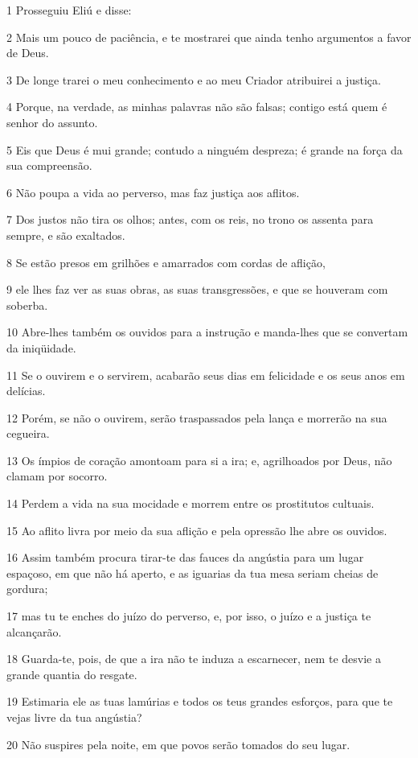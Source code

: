 \par 1 Prosseguiu Eliú e disse:
\par 2 Mais um pouco de paciência, e te mostrarei que ainda tenho argumentos a favor de Deus.
\par 3 De longe trarei o meu conhecimento e ao meu Criador atribuirei a justiça.
\par 4 Porque, na verdade, as minhas palavras não são falsas; contigo está quem é senhor do assunto.
\par 5 Eis que Deus é mui grande; contudo a ninguém despreza; é grande na força da sua compreensão.
\par 6 Não poupa a vida ao perverso, mas faz justiça aos aflitos.
\par 7 Dos justos não tira os olhos; antes, com os reis, no trono os assenta para sempre, e são exaltados.
\par 8 Se estão presos em grilhões e amarrados com cordas de aflição,
\par 9 ele lhes faz ver as suas obras, as suas transgressões, e que se houveram com soberba.
\par 10 Abre-lhes também os ouvidos para a instrução e manda-lhes que se convertam da iniqüidade.
\par 11 Se o ouvirem e o servirem, acabarão seus dias em felicidade e os seus anos em delícias.
\par 12 Porém, se não o ouvirem, serão traspassados pela lança e morrerão na sua cegueira.
\par 13 Os ímpios de coração amontoam para si a ira; e, agrilhoados por Deus, não clamam por socorro.
\par 14 Perdem a vida na sua mocidade e morrem entre os prostitutos cultuais.
\par 15 Ao aflito livra por meio da sua aflição e pela opressão lhe abre os ouvidos.
\par 16 Assim também procura tirar-te das fauces da angústia para um lugar espaçoso, em que não há aperto, e as iguarias da tua mesa seriam cheias de gordura;
\par 17 mas tu te enches do juízo do perverso, e, por isso, o juízo e a justiça te alcançarão.
\par 18 Guarda-te, pois, de que a ira não te induza a escarnecer, nem te desvie a grande quantia do resgate.
\par 19 Estimaria ele as tuas lamúrias e todos os teus grandes esforços, para que te vejas livre da tua angústia?
\par 20 Não suspires pela noite, em que povos serão tomados do seu lugar.
